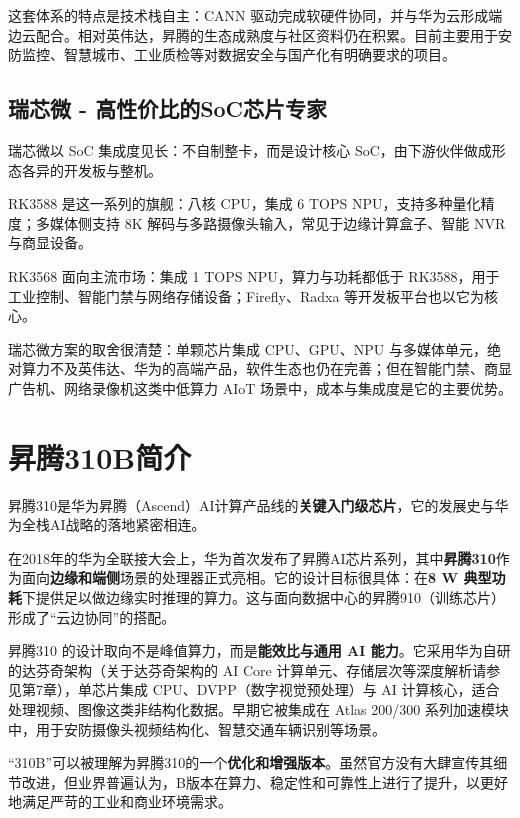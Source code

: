 这套体系的特点是技术栈自主：CANN
驱动完成软硬件协同，并与华为云形成端边云配合。相对英伟达，昇腾的生态成熟度与社区资料仍在积累。目前主要用于安防监控、智慧城市、工业质检等对数据安全与国产化有明确要求的项目。

\subsection{瑞芯微 - 高性价比的SoC芯片专家}\label{src-book-chapter1-h10}

瑞芯微以 SoC 集成度见长：不自制整卡，而是设计核心
SoC，由下游伙伴做成形态各异的开发板与整机。

RK3588 是这一系列的旗舰：八核 CPU，集成 6 TOPS
NPU，支持多种量化精度；多媒体侧支持 8K
解码与多路摄像头输入，常见于边缘计算盒子、智能 NVR 与商显设备。

RK3568 面向主流市场：集成 1 TOPS NPU，算力与功耗都低于
RK3588，用于工业控制、智能门禁与网络存储设备；Firefly、Radxa
等开发板平台也以它为核心。

瑞芯微方案的取舍很清楚：单颗芯片集成 CPU、GPU、NPU
与多媒体单元，绝对算力不及英伟达、华为的高端产品，软件生态也仍在完善；但在智能门禁、商显广告机、网络录像机这类中低算力
AIoT 场景中，成本与集成度是它的主要优势。

\section{昇腾310B简介}\label{src-book-chapter1-h11}

昇腾310是华为昇腾（Ascend）AI计算产品线的\textbf{关键入门级芯片}，它的发展史与华为全栈AI战略的落地紧密相连。

在2018年的华为全联接大会上，华为首次发布了昇腾AI芯片系列，其中\textbf{昇腾310}作为面向\textbf{边缘和端侧}场景的处理器正式亮相。它的设计目标很具体：在\textbf{8
W
典型功耗}下提供足以做边缘实时推理的算力。这与面向数据中心的昇腾910（训练芯片）形成了``云边协同''的搭配。

昇腾310 的设计取向不是峰值算力，而是\textbf{能效比与通用 AI
能力}。它采用华为自研的达芬奇架构（关于达芬奇架构的 AI Core
计算单元、存储层次等深度解析请参见第7章），单芯片集成
CPU、DVPP（数字视觉预处理）与 AI
计算核心，适合处理视频、图像这类非结构化数据。早期它被集成在 Atlas
200/300
系列加速模块中，用于安防摄像头视频结构化、智慧交通车辆识别等场景。

``310B''可以被理解为昇腾310的一个\textbf{优化和增强版本}。虽然官方没有大肆宣传其细节改进，但业界普遍认为，B版本在算力、稳定性和可靠性上进行了提升，以更好地满足严苛的工业和商业环境需求。

